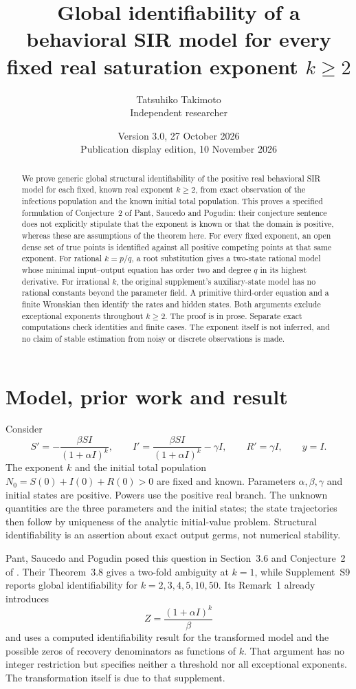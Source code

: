 \documentclass[10pt,a4paper]{article}
\title{Global identifiability of a behavioral SIR model\newline
for every fixed real saturation exponent $k\geq2$}
\author{Tatsuhiko Takimoto\\\small Independent researcher}
\date{Version 3.0, 27 October 2026\\Publication display edition, 10 November 2026}
\theoremstyle{definition}\newtheorem{definition}[theorem]{Definition}
\begin{document}
\maketitle
\begin{abstract}
We prove generic global structural identifiability of the positive real
behavioral SIR model for each fixed, known real exponent $k\geq2$, from
exact observation of the infectious population and the known initial
total population. This proves a specified formulation of Conjecture~2
of Pant, Saucedo and Pogudin: their conjecture sentence does not
explicitly stipulate that the exponent is known or that the domain is
positive, whereas these are assumptions of the theorem here.
For every fixed exponent, an open dense set of true points is
identified against all positive competing points at that same exponent.
For rational $k=p/q$, a root substitution gives a two-state rational
model whose minimal input--output equation has order two and degree
$q$ in its highest derivative. For irrational $k$, the original
supplement's auxiliary-state model has no rational constants beyond
the parameter field. A primitive third-order equation and a finite
Wronskian then identify the rates and hidden states. Both arguments
exclude exceptional exponents throughout $k\geq2$.
The proof is in prose. Separate exact computations check identities
and finite cases. The exponent itself is not inferred, and no claim
of stable estimation from noisy or discrete observations is made.
\end{abstract}

\section{Model, prior work and result}
\label{sec:intro}
Consider
\begin{equation}
S'=-\frac{\beta SI}{(1+\alpha I)^k},\qquad
I'=\frac{\beta SI}{(1+\alpha I)^k}-\gamma I,\qquad
R'=\gamma I,\qquad y=I.
\label{eq:model}
\end{equation}
The exponent $k$ and the initial total population
$N_0=S(0)+I(0)+R(0)>0$ are fixed and known. Parameters
$\alpha,\beta,\gamma$ and initial states are positive. Powers use the
positive real branch. The unknown quantities are the three parameters
and the initial states; the state trajectories then follow by uniqueness
of the analytic initial-value problem. Structural identifiability is
an assertion about exact output germs, not numerical stability.

Pant, Saucedo and Pogudin posed this question in Section~3.6 and
Conjecture~2 of \cite{PSP}. Their Theorem~3.8 gives a two-fold
ambiguity at $k=1$, while Supplement~S9 \cite{PSPsupp} reports global
identifiability for $k=2,3,4,5,10,50$. Its Remark~1 already introduces
\begin{equation}
Z=\frac{(1+\alpha I)^k}{\beta}
\label{eq:S9}
\end{equation}
and uses a computed identifiability result for the transformed model
and the possible zeros of recovery denominators as functions of $k$.
That argument has no integer restriction but specifies neither a
threshold nor all exceptional exponents. The transformation itself
is due to that supplement.
\end{document}
